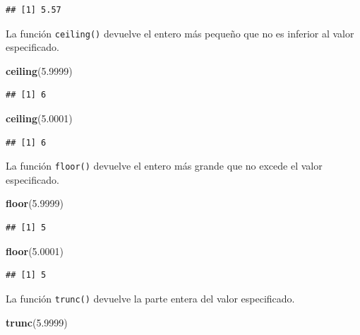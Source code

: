 \documentclass[]{book}
\newenvironment{Shaded}{\begin{snugshade}}{\end{snugshade}}
\newcommand{\KeywordTok}[1]{\textcolor[rgb]{0.13,0.29,0.53}{\textbf{#1}}}
\newcommand{\FloatTok}[1]{\textcolor[rgb]{0.00,0.00,0.81}{#1}}
\newcommand{\NormalTok}[1]{#1}
\begin{document}
\begin{verbatim}
## [1] 5.57
\end{verbatim}

La función \texttt{ceiling()} devuelve el entero más pequeño que no es
inferior al valor especificado.

\begin{Shaded}
\begin{Highlighting}[]
\KeywordTok{ceiling}\NormalTok{(}\FloatTok{5.9999}\NormalTok{)}
\end{Highlighting}
\end{Shaded}

\begin{verbatim}
## [1] 6
\end{verbatim}

\begin{Shaded}
\begin{Highlighting}[]
\KeywordTok{ceiling}\NormalTok{(}\FloatTok{5.0001}\NormalTok{)}
\end{Highlighting}
\end{Shaded}

\begin{verbatim}
## [1] 6
\end{verbatim}

La función \texttt{floor()} devuelve el entero más grande que no excede
el valor especificado.

\begin{Shaded}
\begin{Highlighting}[]
\KeywordTok{floor}\NormalTok{(}\FloatTok{5.9999}\NormalTok{)}
\end{Highlighting}
\end{Shaded}

\begin{verbatim}
## [1] 5
\end{verbatim}

\begin{Shaded}
\begin{Highlighting}[]
\KeywordTok{floor}\NormalTok{(}\FloatTok{5.0001}\NormalTok{)}
\end{Highlighting}
\end{Shaded}

\begin{verbatim}
## [1] 5
\end{verbatim}

La función \texttt{trunc()} devuelve la parte entera del valor
especificado.

\begin{Shaded}
\begin{Highlighting}[]
\KeywordTok{trunc}\NormalTok{(}\FloatTok{5.9999}\NormalTok{)}
\end{Highlighting}
\end{Shaded}
\end{document}
